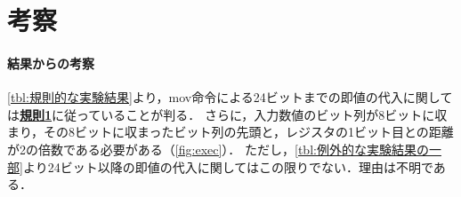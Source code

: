 \section{考察}
\paragraph{結果からの考察}\ref{tbl:規則的な実験結果}より，{\ttfamily mov}命令による24ビットまでの即値の代入に関しては\hyperlink{kisoku1}{\bfseries 規則1}に従っていることが判る．
さらに，入力数値のビット列が8ビットに収まり，その8ビットに収まったビット列の先頭と，レジスタの1ビット目との距離が2の倍数である必要がある（\ref{fig:exec}）．
ただし，\ref{tbl:例外的な実験結果の一部}より24ビット以降の即値の代入に関してはこの限りでない．理由は不明である．\par
{}
\setcounter{reg}{-1}
\newcommand{\reg}[1][]{\refstepcounter{reg}\arabic{reg}}
